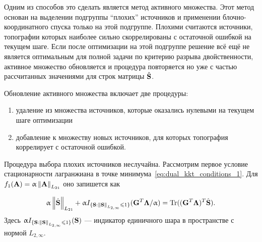 Одним из способов это сделать является метод активного множества.
Этот метод основан на выделении подгруппы ``плохих'' источников
и применении блочно-координатного спуска только на этой подгруппе.
Плохими считаются источники, топографии которых наиболее сильно скоррелированы
с остаточной ошибкой на текущем шаге. Если после оптимизации на этой подгруппе
решение всё ещё не является оптимальным для полной задачи по критерию разрыва двойственности,
активное множество обновляется и процедура повторяется но уже с частью рассчитанных значениями для
строк матрицы $\hat{\mathbf{S}}$.

Обновление активного множества включает две процедуры:
\begin{enumerate}
    \item удаление из множества источников, которые оказались нулевыми на текущем шаге оптимизации
    \item добавление к множеству новых источников, для которых топография коррелирует с остаточной ошибкой.
\end{enumerate}

Процедура выбора плохих источников неслучайна.
Рассмотрим первое условие стационарности лагранжиана в точке минимума~\ref{eq:dual_kkt_conditions_1}.
Для $f_1(\mathbf{A}) = \upalpha\left\lVert\mathbf{A}\right\rVert_{L_{21}}$ оно запишется как

\begin{equation}
    \upalpha \left\lVert\hat{\mathbf{S}}\right\rVert_{L_{21}} + \upalpha I_{\{\mathbf{S} : \left\lVert\mathbf{S}\right\rVert_{L_{2,\infty}} \leqslant 1\}}(\mathbf{G}^T\mathbf{\Lambda}/\upalpha) =
    \operatorname*{Tr}((\mathbf{G}^T\mathbf{\Lambda})^T\hat{\mathbf{S}}).
    \label{eq:dual_kkt_conditions_1_concrete}
\end{equation}
Здесь $\upalpha I_{\{\mathbf{S} : \left\lVert\mathbf{S}\right\rVert_{L_{2,\infty}} \leqslant 1\}}(\mathbf{S})$ --- индикатор единичного шара в пространстве
с нормой $L_{2,\infty}$.


